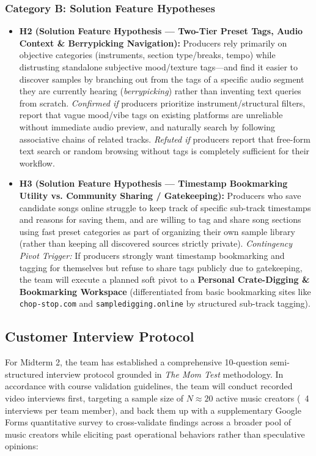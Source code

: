\subsubsection*{Category B: Solution Feature Hypotheses}
\begin{itemize}
    \item \textbf{H2 (Solution Feature Hypothesis --- Two-Tier Preset Tags, Audio Context \& Berrypicking Navigation):} Producers rely primarily on objective categories (instruments, section type/breaks, tempo) while distrusting standalone subjective mood/texture tags---and find it easier to discover samples by branching out from the tags of a specific audio segment they are currently hearing (\textit{berrypicking}) rather than inventing text queries from scratch. \textit{Confirmed if} producers prioritize instrument/structural filters, report that vague mood/vibe tags on existing platforms are unreliable without immediate audio preview, and naturally search by following associative chains of related tracks. \textit{Refuted if} producers report that free-form text search or random browsing without tags is completely sufficient for their workflow.
    \item \textbf{H3 (Solution Feature Hypothesis --- Timestamp Bookmarking Utility vs. Community Sharing / Gatekeeping):} Producers who save candidate songs online struggle to keep track of specific sub-track timestamps and reasons for saving them, and are willing to tag and share song sections using fast preset categories as part of organizing their own sample library (rather than keeping all discovered sources strictly private). \textit{Contingency Pivot Trigger:} If producers strongly want timestamp bookmarking and tagging for themselves but refuse to share tags publicly due to gatekeeping, the team will execute a planned soft pivot to a \textbf{Personal Crate-Digging \& Bookmarking Workspace} (differentiated from basic bookmarking sites like \texttt{chop-stop.com} and \texttt{sampledigging.online} by structured sub-track tagging).
\end{itemize}

\subsection*{Customer Interview Protocol}
For Midterm 2, the team has established a comprehensive 10-question semi-structured interview protocol grounded in \textit{The Mom Test} methodology. In accordance with course validation guidelines, the team will conduct recorded video interviews first, targeting a sample size of $N \approx 20$ active music creators (~4 interviews per team member), and back them up with a supplementary Google Forms quantitative survey to cross-validate findings across a broader pool of music creators while eliciting past operational behaviors rather than speculative opinions:

